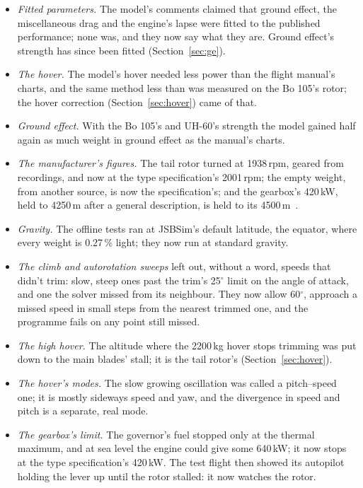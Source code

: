 \documentclass[10pt,a4paper,twocolumn]{article}
\begin{document}
\begin{itemize}
the aircraft gets light, as a pilot's does, with the stick aft, the Alouette's CG being ahead of its mast.
\item \emph{Fitted parameters.} The model's comments claimed that ground effect, the miscellaneous drag and the engine's lapse were fitted
to the published performance; none was, and they now say what they are. Ground effect's strength has since been fitted
(Section~\ref{sec:ge}).
\item \emph{The hover.} The model's hover needed less power than the flight manual's charts, and the same method less than was measured
on the Bo 105's rotor; the hover correction (Section~\ref{sec:hover}) came of that.
\item \emph{Ground effect.} With the Bo 105's and UH-60's strength the model gained half again as much weight in ground effect as the
manual's charts.
\item \emph{The manufacturer's figures.} The tail rotor turned at 1938\,rpm, geared from recordings, and now at the type
specification's 2001\,rpm; the empty weight, from another source, is now the specification's; and the gearbox's 420\,kW, held to
4250\,m after a general description, is held to its 4500\,m~\cite{spec}.
\item \emph{Gravity.} The offline tests ran at JSBSim's default latitude, the equator, where every weight is 0.27\,\% light; they now
run at standard gravity.
\item \emph{The climb and autorotation sweeps} left out, without a word, speeds that didn't trim: slow, steep ones past the trim's
25$^\circ$ limit on the angle of attack, and one the solver missed from its neighbour. They now allow 60$^\circ$, approach a missed
speed in small steps from the nearest trimmed one, and the programme fails on any point still missed.
\item \emph{The high hover.} The altitude where the 2200\,kg hover stops trimming was put down to the main blades' stall; it is the
tail rotor's (Section~\ref{sec:hover}).
\item \emph{The hover's modes.} The slow growing oscillation was called a pitch--speed one; it is mostly sideways speed and yaw, and
the divergence in speed and pitch is a separate, real mode.
\item \emph{The gearbox's limit.} The governor's fuel stopped only at the thermal maximum, and at sea level the engine could give
some 640\,kW; it now stops at the type specification's 420\,kW. The test flight then showed its autopilot holding the lever up until
the rotor stalled: it now watches the rotor.

\end{itemize}
\end{document}
